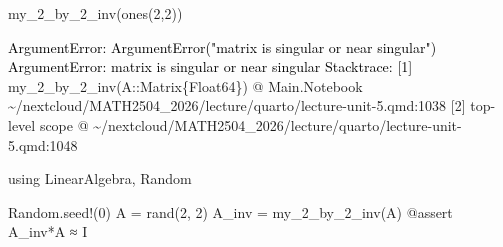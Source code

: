 \documentclass[
]{article}
\newenvironment{Shaded}{\begin{snugshade}}{\end{snugshade}}
\newcommand{\BuiltInTok}[1]{\textcolor[rgb]{0.00,0.23,0.31}{#1}}
\newcommand{\FloatTok}[1]{\textcolor[rgb]{0.68,0.00,0.00}{#1}}
\newcommand{\FunctionTok}[1]{\textcolor[rgb]{0.28,0.35,0.67}{#1}}
\newcommand{\ImportTok}[1]{\textcolor[rgb]{0.00,0.46,0.62}{#1}}
\newcommand{\NormalTok}[1]{\textcolor[rgb]{0.00,0.23,0.31}{#1}}
\newcommand{\OperatorTok}[1]{\textcolor[rgb]{0.37,0.37,0.37}{#1}}
\newcommand{\PreprocessorTok}[1]{\textcolor[rgb]{0.68,0.00,0.00}{#1}}
\begin{document}
\begin{Shaded}
\begin{Highlighting}[]
\FunctionTok{my\_2\_by\_2\_inv}\NormalTok{(}\FunctionTok{ones}\NormalTok{(}\FloatTok{2}\NormalTok{,}\FloatTok{2}\NormalTok{))}
\end{Highlighting}
\end{Shaded}

\begin{Highlighting}
\textcolor{black}{ArgumentError: ArgumentError("matrix is singular or near singular")}
\textcolor{black}{ArgumentError: matrix is singular or near singular}
\textcolor{black}{Stacktrace:}
\textcolor{black}{ [1] }\textcolor{QuartoInternalColor1}{}\textcolor{QuartoInternalColor1}{my\_2\_by\_2\_inv}\textcolor{QuartoInternalColor1}{}\textcolor{QuartoInternalColor1}{}\textcolor{QuartoInternalColor1}{(}\textcolor{QuartoInternalColor1}{}\textcolor{QuartoInternalColor1}{A}\textcolor{QuartoInternalColor1}{::}\textcolor{QuartoInternalColor1}{Matrix}\textcolor{QuartoInternalColor1}{\{Float64\}}\textcolor{QuartoInternalColor1}{}\textcolor{QuartoInternalColor1}{}\textcolor{QuartoInternalColor1}{)}\textcolor{QuartoInternalColor1}{}
\textcolor{QuartoInternalColor1}{}\textcolor{QuartoInternalColor1}{   @}\textcolor{QuartoInternalColor1}{ }\textcolor{QuartoInternalColor2}{Main.Notebook}\textcolor{QuartoInternalColor1}{ }\textcolor{QuartoInternalColor1}{\textasciitilde{}/nextcloud/MATH2504\_2026/lecture/quarto/}\textcolor{QuartoInternalColor1}{}\textcolor{QuartoInternalColor1}{}\textcolor{QuartoInternalColor1}{lecture-unit-5.qmd:1038}\textcolor{QuartoInternalColor1}{}\textcolor{QuartoInternalColor1}{}
\textcolor{QuartoInternalColor1}{ [2] top-level scope}
\textcolor{QuartoInternalColor1}{}\textcolor{QuartoInternalColor1}{   @}\textcolor{QuartoInternalColor1}{ }\textcolor{QuartoInternalColor1}{\textasciitilde{}/nextcloud/MATH2504\_2026/lecture/quarto/}\textcolor{QuartoInternalColor1}{}\textcolor{QuartoInternalColor1}{}\textcolor{QuartoInternalColor1}{lecture-unit-5.qmd:1048}\textcolor{QuartoInternalColor1}{}\textcolor{QuartoInternalColor1}{}
\end{Highlighting}

\begin{Shaded}
\begin{Highlighting}[]
\ImportTok{using} \BuiltInTok{LinearAlgebra}\NormalTok{, }\BuiltInTok{Random}

\BuiltInTok{Random}\NormalTok{.}\FunctionTok{seed!}\NormalTok{(}\FloatTok{0}\NormalTok{)}
\NormalTok{A }\OperatorTok{=} \FunctionTok{rand}\NormalTok{(}\FloatTok{2}\NormalTok{, }\FloatTok{2}\NormalTok{)}
\NormalTok{A\_inv }\OperatorTok{=} \FunctionTok{my\_2\_by\_2\_inv}\NormalTok{(A)}
\PreprocessorTok{@assert}\NormalTok{ A\_inv}\OperatorTok{*}\NormalTok{A }\OperatorTok{≈}\NormalTok{ I}
\end{Highlighting}
\end{Shaded}
\end{document}
